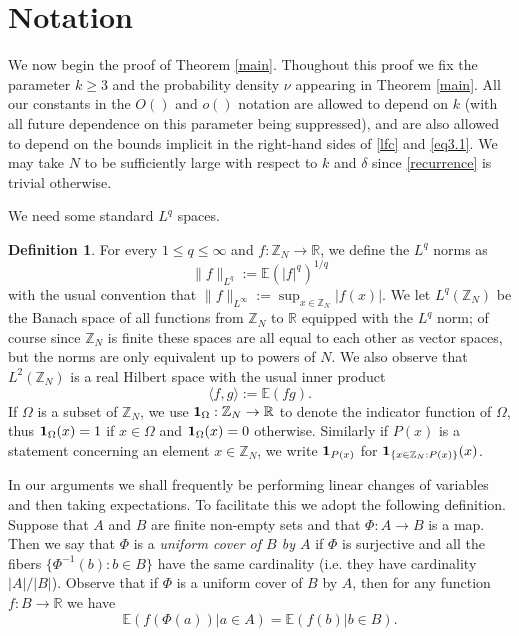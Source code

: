 \documentclass[12pt,a4paper,reqno]{amsart}
\numberwithin{equation}{section}
\theoremstyle{plain}
\theoremstyle{definition}
\newtheorem{definition}[subsection]{Definition}
\renewcommand{\leq}{\leqslant}
\renewcommand{\geq}{\geqslant}
\def\Z{{\mathbb Z}}
\def\E{{\mathbb E}}
\def\R{{\mathbb R}}
\def\vs{\vspace{11pt}}
\def\ni{\noindent}
\begin{document}
\section{Notation}\label{sec4}

\ni We now begin the proof of Theorem \ref{main}. Thoughout this proof we fix the parameter $k \geq 3$
and the probability density $\nu$ appearing in 
Theorem \ref{main}.  All our constants in the $O()$ and $o()$ notation are allowed to depend on $k$ (with all future dependence on this parameter being suppressed), and are also allowed to depend on
the bounds implicit in the right-hand sides of \eqref{lfc} and \eqref{eq3.1}.  We may take $N$ to be 
sufficiently large with respect to $k$ and $\delta$ since \eqref{recurrence} is trivial otherwise.\vs

\ni We need some standard $L^q$ spaces.

\begin{definition}  For every $1 \leq q \leq \infty$ and $f: \mathbb{Z}_N \to \R$, we define the $L^q$ norms as
$$\|f\|_{L^q} := \E(|f|^q)^{1/q}$$
with the usual convention that $\|f\|_{L^\infty} := \sup_{x \in \mathbb{Z}_N} |f(x)|$.  We let $L^q(\Z_N)$ be the Banach space of all
functions from $\Z_N$ to $\R$ equipped with the $L^q$ norm; of course since $\Z_N$ is finite these spaces are all equal to each other
as vector spaces, but the norms are only equivalent up to powers of $N$.  We also observe that $L^2(\Z_N)$ is a real Hilbert space
with the usual inner product
$$ \langle f, g \rangle := \E( f g ).$$
If $\Omega$ is a subset of $\mathbb{Z}_N$, we use ${\bf 1}_\Omega: \mathbb{Z}_N \to \R$ to denote the indicator function of
$\Omega$, thus ${\bf 1}_\Omega(x) = 1$ if $x \in \Omega$ and ${\bf 1}_\Omega(x) = 0$ otherwise.  Similarly if $P(x)$ is a statement
concerning an element $x \in \Z_N$, we write ${\bf 1}_{P(x)}$ for ${\bf 1}_{\{ x \in \Z_N: P(x) \}}(x)$.
\end{definition}

\ni In our arguments we shall frequently be performing linear changes of variables and then taking expectations.  To facilitate this we 
adopt the following definition.
Suppose that $A$ and $B$ are finite non-empty sets and that $\Phi: A \to B$ is a map. Then we say that $\Phi$ is a \textit{uniform cover of $B$ by $A$} if $\Phi$ is surjective and all the fibers $\{ \Phi^{-1}(b): b \in B\}$ have the same cardinality (i.e. they have
cardinality $|A|/|B|$).  Observe that if $\Phi$ is a uniform cover of $B$ by $A$, then for any function $f: B \to \R$ 
we have 
\begin{equation}\label{uniform-cover}
\E( f(\Phi(a)) | a \in A ) = \E( f(b) | b \in B ).
\end{equation}
\end{document}
